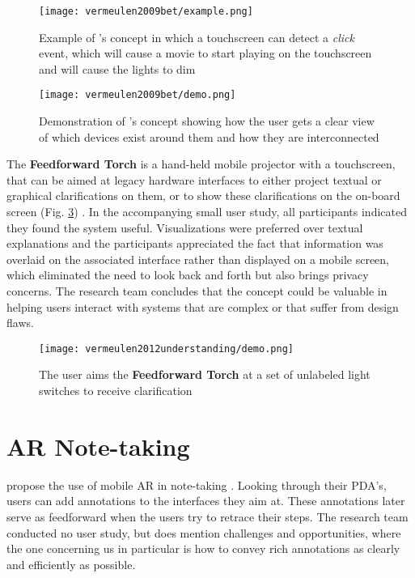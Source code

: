 \begin{figure}
    \centering
    \texttt{[image: vermeulen2009bet/example.png]}
    \caption{Example of \textbf{\citeauthor{vermeulen2009bet}}'s concept in which a touchscreen can detect a \textit{click} event, which will cause a movie to start playing on the touchscreen and will cause the lights to dim \cite{vermeulen2009bet}}
    \label{fig:vermeulen2009bet_mockup}
\end{figure}

\begin{figure}
    \centering
    \texttt{[image: vermeulen2009bet/demo.png]}
    \caption{Demonstration of \textbf{\citeauthor{vermeulen2009bet}}'s concept showing how the user gets a clear view of which devices exist around them and how they are interconnected \cite{vermeulen2009bet}}
    \label{fig:vermeulen2009bet_demo}
\end{figure}

The \textbf{Feedforward Torch} is a hand-held mobile projector with a touchscreen, that can be aimed at legacy hardware interfaces to either project textual or graphical clarifications on them, or to show these clarifications on the on-board screen (Fig. \ref{fig:vermeulen2012understanding_demo}) \cite{vermeulen2012understanding}. In the accompanying small user study, all participants indicated they found the system useful. Visualizations were preferred over textual explanations and the participants appreciated the fact that information was overlaid on the associated interface rather than displayed on a mobile screen, which eliminated the need to look back and forth but also brings privacy concerns. The research team concludes that the concept could be valuable in helping users interact with systems that are complex or that suffer from design flaws.

\begin{figure}
    \centering
    \texttt{[image: vermeulen2012understanding/demo.png]}
    \caption{The user aims the \textbf{Feedforward Torch} at a set of unlabeled light switches to receive clarification \cite{vermeulen2012understanding}}
    \label{fig:vermeulen2012understanding_demo}
\end{figure}

\section{AR Note-taking} \label{sec:related_work:ar_note-taking}
\textbf{\citeauthor{liu2011mobile}} propose the use of mobile AR in note-taking \cite{liu2011mobile}. Looking through their PDA's, users can add annotations to the interfaces they aim at. These annotations later serve as feedforward when the users try to retrace their steps. The research team conducted no user study, but does mention challenges and opportunities, where the one concerning us in particular is how to convey rich annotations as clearly and efficiently as possible.

